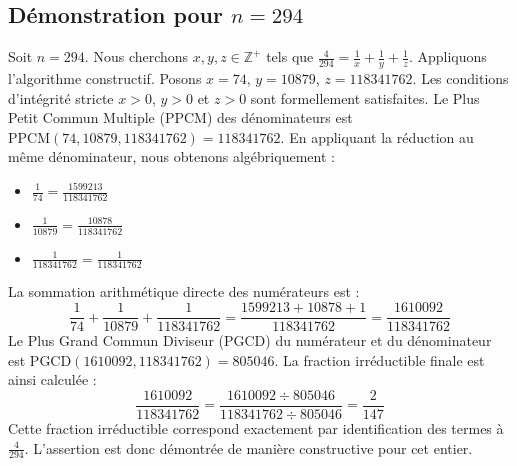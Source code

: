 \documentclass[11pt,a4paper]{article}
\begin{document}
\subsection{Démonstration pour $n = 294$}
Soit $n = 294$. Nous cherchons $x, y, z \in \mathbb{Z}^{+}$ tels que $\frac{4}{294} = \frac{1}{x} + \frac{1}{y} + \frac{1}{z}$.
Appliquons l'algorithme constructif. Posons $x = 74$, $y = 10879$, $z = 118341762$.
Les conditions d'intégrité stricte $x > 0$, $y > 0$ et $z > 0$ sont formellement satisfaites.
Le Plus Petit Commun Multiple (PPCM) des dénominateurs est $\text{PPCM}(74, 10879, 118341762) = 118341762$.
En appliquant la réduction au même dénominateur, nous obtenons algébriquement :
\begin{itemize}
    \item $\frac{1}{74} = \frac{1599213}{118341762}$
    \item $\frac{1}{10879} = \frac{10878}{118341762}$
    \item $\frac{1}{118341762} = \frac{1}{118341762}$
\end{itemize}
La sommation arithmétique directe des numérateurs est :
$$ \frac{1}{74} + \frac{1}{10879} + \frac{1}{118341762} = \frac{1599213 + 10878 + 1}{118341762} = \frac{1610092}{118341762} $$
Le Plus Grand Commun Diviseur (PGCD) du numérateur et du dénominateur est $\text{PGCD}(1610092, 118341762) = 805046$.
La fraction irréductible finale est ainsi calculée :
$$ \frac{1610092}{118341762} = \frac{1610092 \div 805046}{118341762 \div 805046} = \frac{2}{147} $$
Cette fraction irréductible correspond exactement par identification des termes à $\frac{4}{294}$. L'assertion est donc démontrée de manière constructive pour cet entier.
\end{document}
